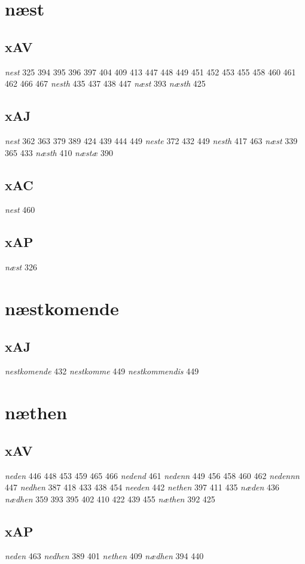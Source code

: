 \documentclass[a4paper,twocolumn]{article}
\begin{document}
\section{næst}
\label{sec:orgf37c794}
\subsection{xAV}
\label{sec:orga3bdf23}
\emph{nest} 325 394 395 396 397 404 409 413 447 448 449 451 452 453 455 458 460 461 462 466 467 \emph{nesth} 435 437 438 447 \emph{næst} 393 \emph{næsth} 425 
\subsection{xAJ}
\label{sec:orgbd74f69}
\emph{nest} 362 363 379 389 424 439 444 449 \emph{neste} 372 432 449 \emph{nesth} 417 463 \emph{næst} 339 365 433 \emph{næsth} 410 \emph{næstæ} 390 
\subsection{xAC}
\label{sec:orgcfc154f}
\emph{nest} 460 
\subsection{xAP}
\label{sec:org7797377}
\emph{næst} 326 
\section{næstkomende}
\label{sec:org23edf88}
\subsection{xAJ}
\label{sec:orgf412418}
\emph{nestkomende} 432 \emph{nestkomme} 449 \emph{nestkommendis} 449 
\section{næthen}
\label{sec:org02a1ed4}
\subsection{xAV}
\label{sec:org3ebb574}
\emph{neden} 446 448 453 459 465 466 \emph{nedend} 461 \emph{nedenn} 449 456 458 460 462 \emph{nedennn} 447 \emph{nedhen} 387 418 433 438 454 \emph{needen} 442 \emph{nethen} 397 411 435 \emph{næden} 436 \emph{nædhen} 359 393 395 402 410 422 439 455 \emph{næthen} 392 425 
\subsection{xAP}
\label{sec:orga74cf8d}
\emph{neden} 463 \emph{nedhen} 389 401 \emph{nethen} 409 \emph{nædhen} 394 440 
\end{document}
